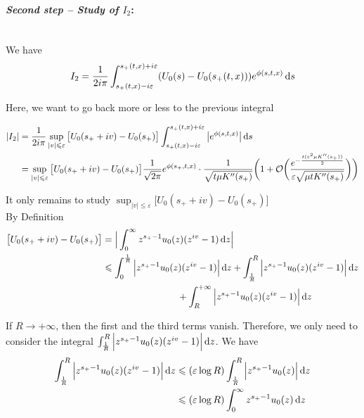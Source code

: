 \medskip
\paragraph{\textit{Second step -- Study of $I_2$}:}\mbox{}\\
We have 
    \begin{equation*}
        I_2 = \frac{1}{2i \pi} \int_{s_+(t,x) - i\varepsilon}^{s_+(t,x) + i\varepsilon} (U_0(s) -  U_0(s_+(t,x)))  e^{\phi(s,t,x)} \, \mathrm ds 
    \end{equation*}
    
Here, we want to go back more or less to the previous integral

    \begin{align*}
         |I_2| 
         &= 
         \frac{1}{2i \pi} \sup_{|v| \leqslant \varepsilon} \big[U_0(s_+ + iv) -  U_0(s_+) \big] \int_{s_+(t,x) - i\varepsilon}^{s_+(t,x) + i\varepsilon} \big| e^{\phi(s,t,x)} \big| \, \mathrm ds \\
         &=
         \sup_{|v| \leqslant \varepsilon} \big[U_0(s_+ + iv) -  U_0(s_+) \big] \frac{1}{\sqrt{2\pi}} e^{\phi(s_+, t, x)} \cdot \frac{1}{\sqrt{t \mu K''(s_+)}} \bigg( 
    1 + \mathcal{O}\bigg(\frac{e^{-\frac{t(\varepsilon^2 \mu K''(s_+))}{2}} }{\varepsilon \sqrt{\mu tK''(s_+)}}\bigg) \bigg)
    \end{align*}
    
It only remains to study $  \sup_{|v| \leq \varepsilon} \big[U_0(s_+ + iv) -  U_0(s_+) \big]$ \\

By Definition
\begin{align*}
    \big[U_0(s_+ + iv) -  U_0(s_+) \big]
    &= \Big| \int_0^\infty  z^{s_+ - 1}u_0(z) (z^{iv} - 1) \, \mathrm dz \Big| \\
    &\leqslant \int_0^{\frac{1}{R}} \Big|  z^{s_+ - 1}u_0(z) (z^{iv} - 1) \Big| \, \mathrm dz
        + \int_{\frac{1}{R}}^R \Big|  z^{s_+ - 1}u_0(z) (z^{iv} - 1) \Big| \, \mathrm dz \\
        &\qquad \qquad \qquad \qquad
        + \int_R^{+\infty} \Big|  z^{s_+ - 1}u_0(z) (z^{iv} - 1) \Big| \, \mathrm dz \\
\end{align*}

If $R \to + \infty$, then the first and the third terms vanish. Therefore, we only need to consider the integral $ \int_{\frac{1}{R}}^R \Big|  z^{s_+ - 1}u_0(z) (z^{iv} - 1) \Big| \, \mathrm dz$. We have
    \begin{align*}
         \int_{\frac{1}{R}}^R \Big|  z^{s_+ - 1}u_0(z) (z^{iv} - 1) \Big| \, \mathrm dz 
         &\leqslant 
          (\varepsilon \log R)\int_{\frac{1}{R}}^R \Big|  z^{s_+ - 1}u_0(z) \Big| \, \mathrm dz \\
         &\leqslant 
          (\varepsilon \log R)\int_{0}^{\infty} z^{s_+ - 1}u_0(z)  \, \mathrm dz \\
    \end{align*}

